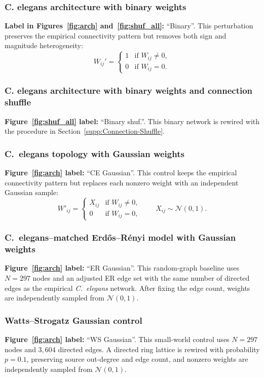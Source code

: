 \documentclass[a4paper,fleqn]{style_neural_networks/cas-dc}
\begin{document}
\subsubsection{C. elegans architecture with binary weights}
\noindent\textbf{Label in Figures~\ref{fig:arch} and~\ref{fig:shuf_all}:} \enquote{Binary}.
This perturbation preserves the empirical connectivity pattern but removes both sign and magnitude heterogeneity:
\[
W_{ij}' =
\begin{cases}
1 & \text{if } W_{ij} \neq 0,\\
0 & \text{if } W_{ij} = 0.
\end{cases}
\]

\subsubsection{C. elegans architecture with binary weights and connection shuffle}
\noindent\textbf{Figure~\ref{fig:shuf_all} label:} \enquote{Binary shuf.}.
This binary network is rewired with the procedure in Section~\ref{supp:Connection-Shuffle}.

\subsubsection{C.~elegans topology with Gaussian weights}
\noindent\textbf{Figure~\ref{fig:arch} label:} \enquote{CE Gaussian}.
This control keeps the empirical connectivity pattern but replaces each nonzero weight with an independent Gaussian sample:
\[
W'_{ij} =
\begin{cases}
X_{ij} & \text{if } W_{ij} \neq 0,\\
0 & \text{if } W_{ij} = 0,
\end{cases}
\qquad
X_{ij}\sim\mathcal{N}(0,1).
\]

\subsubsection{C.~elegans--matched Erd\H{o}s--R\'enyi model with Gaussian weights}
\noindent\textbf{Figure~\ref{fig:arch} label:} \enquote{ER Gaussian}.
This random-graph baseline uses \(N=297\) nodes and an adjusted ER edge set with the same number of directed edges as the empirical \emph{C.~elegans} network. After fixing the edge count, weights are independently sampled from \(\mathcal{N}(0,1)\).

\subsubsection{Watts--Strogatz Gaussian control}
\noindent\textbf{Figure~\ref{fig:arch} label:} \enquote{WS Gaussian}.
This small-world control uses \(N=297\) nodes and \(3,604\) directed edges. A directed ring lattice is rewired with probability \(p=0.1\), preserving source out-degree and edge count, and nonzero weights are independently sampled from \(\mathcal{N}(0,1)\).
\end{document}

